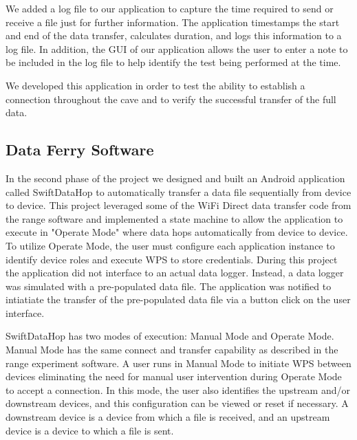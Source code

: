 \documentclass[10pt,twocolumn]{article}
\begin{document}
We added a log file to our application to capture the time required to send or receive a file just for further information.
The application timestamps the start and end of the data transfer, calculates duration, and logs this information to a log file.
In addition, the GUI of our application allows the user to enter a note to be included in the log file to help identify the test being performed at the time.

We developed this application in order to test the ability to establish a connection throughout the cave and to verify the successful transfer of the full data.

\subsection{Data Ferry Software}
\label{sec:Data Ferry Software}
In the second phase of the project we designed and built an Android application called SwiftDataHop to automatically transfer a data file sequentially from device to device. 
This project leveraged some of the WiFi Direct data transfer code from the range software and implemented a state machine to allow the application to execute in "Operate Mode" where data hops automatically from device to device. 
To utilize Operate Mode, the user must configure each application instance to identify device roles and execute WPS to store credentials.
During this project the application did not interface to an actual data logger.
Instead, a data logger was simulated with a pre-populated data file.
The application was notified to intiatiate the transfer of the pre-populated data file via a button click on the user interface.

SwiftDataHop has two modes of execution: Manual Mode and Operate Mode.
Manual Mode has the same connect and transfer capability as described in the range experiment software.
A user runs in Manual Mode to initiate WPS between devices eliminating the need for manual user intervention during Operate Mode to accept a connection.
In this mode, the user also identifies the upstream and/or downstream devices, 
and this configuration can be viewed or reset if necessary.
A downstream device is a device from which a file is received, and an upstream device is a device to which a file is sent.
\end{document}
